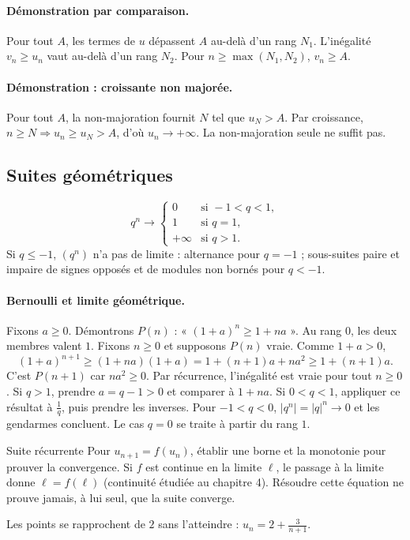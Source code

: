 \paragraph{Démonstration par comparaison.} Pour tout $A$, les termes de $u$ dépassent $A$ au-delà d'un rang $N_1$. L'inégalité $v_n\ge u_n$ vaut au-delà d'un rang $N_2$. Pour $n\ge\max(N_1,N_2)$, $v_n\ge A$.
\paragraph{Démonstration : croissante non majorée.} Pour tout $A$, la non-majoration fournit $N$ tel que $u_N>A$. Par croissance, $n\ge N\Rightarrow u_n\ge u_N>A$, d'où $u_n\to+\infty$. La non-majoration seule ne suffit pas.
\subsection{Suites géométriques}
\[q^n\longrightarrow\begin{cases}0&\text{si }-1<q<1,\\1&\text{si }q=1,\\+\infty&\text{si }q>1.\end{cases}\]
Si $q\le-1$, $(q^n)$ n'a pas de limite : alternance pour $q=-1$ ; sous-suites paire et impaire de signes opposés et de modules non bornés pour $q<-1$.
\paragraph{Bernoulli et limite géométrique.} Fixons $a\ge0$. Démontrons $P(n)$ : « $(1+a)^n\ge1+na$ ». Au rang $0$, les deux membres valent $1$.
Fixons $n\ge0$ et supposons $P(n)$ vraie. Comme $1+a>0$,
\[(1+a)^{n+1}\ge(1+na)(1+a)=1+(n+1)a+na^2\ge1+(n+1)a.\]
C'est $P(n+1)$ car $na^2\ge0$. Par récurrence, l'inégalité est vraie pour tout $n\ge0$. Si $q>1$, prendre $a=q-1>0$ et comparer à $1+na$. Si $0<q<1$, appliquer ce résultat à $\frac{1}{q}$, puis prendre les inverses. Pour $-1<q<0$, $|q^n|=|q|^n\to0$ et les gendarmes concluent. Le cas $q=0$ se traite à partir du rang $1$.
\begin{methode}{Suite récurrente}
Pour $u_{n+1}=f(u_n)$, établir une borne et la monotonie pour prouver la convergence. Si $f$ est continue en la limite $\ell$, le passage à la limite donne $\ell=f(\ell)$ (continuité étudiée au chapitre 4). Résoudre cette équation ne prouve jamais, à lui seul, que la suite converge.
\end{methode}


\begin{center}\par\small Les points se rapprochent de $2$ sans l'atteindre : $u_n=2+\frac{3}{n+1}$.\end{center}

